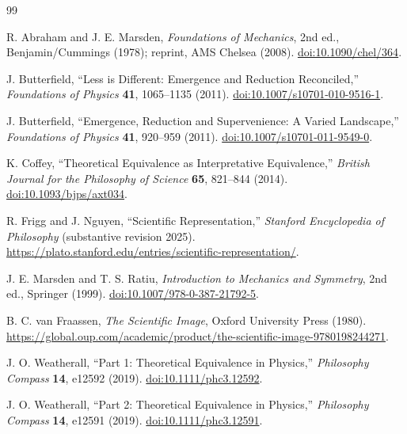\documentclass[11pt]{article}
\theoremstyle{remark}
\begin{document}
\begin{thebibliography}{99}

R. Abraham and J. E. Marsden,
\emph{Foundations of Mechanics}, 2nd ed., Benjamin/Cummings (1978); reprint, AMS Chelsea (2008).
\href{https://doi.org/10.1090/chel/364}{doi:10.1090/chel/364}.

J. Butterfield,
``Less is Different: Emergence and Reduction Reconciled,''
\emph{Foundations of Physics} \textbf{41}, 1065--1135 (2011).
\href{https://doi.org/10.1007/s10701-010-9516-1}{doi:10.1007/s10701-010-9516-1}.

J. Butterfield,
``Emergence, Reduction and Supervenience: A Varied Landscape,''
\emph{Foundations of Physics} \textbf{41}, 920--959 (2011).
\href{https://doi.org/10.1007/s10701-011-9549-0}{doi:10.1007/s10701-011-9549-0}.

K. Coffey,
``Theoretical Equivalence as Interpretative Equivalence,''
\emph{British Journal for the Philosophy of Science} \textbf{65}, 821--844 (2014).
\href{https://doi.org/10.1093/bjps/axt034}{doi:10.1093/bjps/axt034}.

R. Frigg and J. Nguyen,
``Scientific Representation,''
\emph{Stanford Encyclopedia of Philosophy} (substantive revision 2025).
\url{https://plato.stanford.edu/entries/scientific-representation/}.

J. E. Marsden and T. S. Ratiu,
\emph{Introduction to Mechanics and Symmetry}, 2nd ed., Springer (1999).
\href{https://doi.org/10.1007/978-0-387-21792-5}{doi:10.1007/978-0-387-21792-5}.

B. C. van Fraassen,
\emph{The Scientific Image}, Oxford University Press (1980).
\url{https://global.oup.com/academic/product/the-scientific-image-9780198244271}.

J. O. Weatherall,
``Part 1: Theoretical Equivalence in Physics,''
\emph{Philosophy Compass} \textbf{14}, e12592 (2019).
\href{https://doi.org/10.1111/phc3.12592}{doi:10.1111/phc3.12592}.

J. O. Weatherall,
``Part 2: Theoretical Equivalence in Physics,''
\emph{Philosophy Compass} \textbf{14}, e12591 (2019).
\href{https://doi.org/10.1111/phc3.12591}{doi:10.1111/phc3.12591}.

\end{thebibliography}
\end{document}
